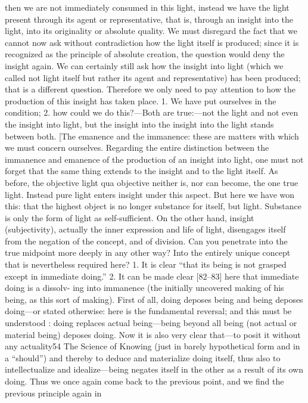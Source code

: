 then we are not immediately consumed in this light, instead we have the light
present through its agent or representative, that is, through an insight into the
light, into its originality or absolute quality. We must disregard the fact that
we cannot now ask without contradiction how the light itself is produced;
since it is recognized as the principle of absolute creation, the question would
deny the insight again. We can certainly still ask how the insight into light
(which we called not light itself but rather its agent and representative) has
been produced; that is a different question. Therefore we only need to pay
attention to how the production of this insight has taken place. 1. We have put
ourselves in the condition; 2. how could we do this?—Both are true:—not the
light and not even the insight into light, but the insight into the insight into
the light stands between both. [The emanence and the immanence: these are
matters with which we must concern ourselves.
Regarding the entire distinction between the immanence and emanence
of the production of an insight into light, one must not forget that the same
thing extends to the insight and to the light itself. As before, the objective light
qua objective neither is, nor can become, the one true light. Instead pure light
enters insight under this aspect. But here we have won this: that the highest
object is no longer substance for itself, but light. Substance is only the form of
light as self-sufficient. On the other hand, insight (subjectivity), actually the
inner expression and life of light, disengages itself from the negation of the
concept, and of division. Can you penetrate into the true midpoint more
deeply in any other way? Into the entirely unique concept that is nevertheless
required here? 1. It is clear “that its being is not grasped except in immediate
doing.” 2. It can be made clear [82–83] here that immediate doing is a dissolv-
ing into immanence (the initially uncovered making of his being, as this sort
of making). First of all, doing deposes being and being deposes doing—or stated
otherwise: here is the fundamental reversal; and this must be understood : doing
replaces actual being—being beyond all being (not actual or material being)
deposes doing. Now it is also very clear that—to posit it without any actuality54
The Science of Knowing
(just in barely hypothetical form and in a “should”) and thereby to deduce and
materialize doing itself, thus also to intellectualize and idealize—being
negates itself in the other as a result of its own doing. Thus we once again
come back to the previous point, and we find the previous principle again in
